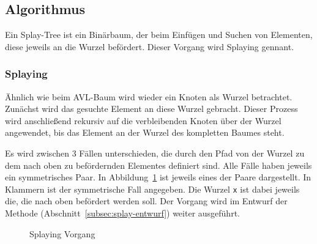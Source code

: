 \subsection{Algorithmus}\label{subsec:splay-algorithmus}
Ein Splay-Tree ist ein Binärbaum, der beim Einfügen und Suchen von Elementen, diese jeweils an
die Wurzel befördert.
Dieser Vorgang wird Splaying gennant.

\subsubsection{Splaying}
Ähnlich wie beim AVL-Baum wird wieder ein Knoten als Wurzel betrachtet.
Zunächst wird das gesuchte Element an diese Wurzel gebracht.
Dieser Prozess wird anschließend rekursiv auf die verbleibenden Knoten über der Wurzel angewendet,
bis das Element an der Wurzel des kompletten Baumes steht.

Es wird zwischen 3 Fällen unterschieden, die durch den Pfad von der Wurzel zu dem nach oben
zu befördernden Elementes definiert sind.
Alle Fälle haben jeweils ein symmetrisches Paar.
In Abbildung~\ref{fig:splayinCase} ist jeweils eines der Paare dargestellt.
In Klammern ist der symmetrische Fall angegeben.
Die Wurzel \verb|x| ist dabei jeweils die, die nach oben befördert werden soll.
Der Vorgang wird im Entwurf der Methode  (Abschnitt~\ref{subsec:splay-entwurf})
weiter ausgeführt.

\begin{figure}[hbt]
    \centering
    \qquad
    \qquad
    \caption{Splaying Vorgang}\label{fig:splayinCase}
\end{figure}

